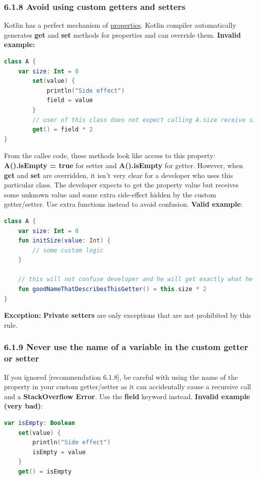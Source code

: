 \subsubsection*{\textbf{6.1.8 Avoid using custom getters and setters}}
\leavevmode\newline
\label{sec:6.1.8}
Kotlin has a perfect mechanism of \href{https://kotlinlang.org/docs/reference/properties.html#properties-and-fields}{properties}.
Kotlin compiler automatically generates \textbf{get} and \textbf{set} methods for properties and can override them.
\textbf{Invalid example:}
\begin{lstlisting}[language=Kotlin]
class A {
    var size: Int = 0
        set(value) {
            println("Side effect")
            field = value
        }
        // user of this class does not expect calling A.size receive size * 2 
        get() = field * 2
}
\end{lstlisting}
From the callee code, these methods look like access to this property: \textbf{A().isEmpty = true} for setter and \textbf{A().isEmpty} for getter.
However, when \textbf{get} and \textbf{set} are overridden, it  isn't very clear for a developer who uses this particular class. 
The developer expects to get the property value but receives some unknown value and some extra side-effect hidden by the custom getter/setter. 
Use extra functions instead to avoid confusion.
\textbf{Valid example}:
\begin{lstlisting}[language=Kotlin]
class A {
    var size: Int = 0
    fun initSize(value: Int) {
        // some custom logic
    }
    
    // this will not confuse developer and he will get exactly what he expects    
    fun goodNameThatDescribesThisGetter() = this.size * 2
}
\end{lstlisting}
\textbf{Exception:} \textbf{Private setters} are only exceptions that are not prohibited by this rule.
\subsubsection*{\textbf{6.1.9 Never use the name of a variable in the custom getter or setter}}
\leavevmode\newline
\label{sec:6.1.9}
If you ignored [recommendation 6.1.8], be careful with using the name of the property in your custom getter/setter
as it can accidentally cause a recursive call and a \textbf{StackOverflow Error}. Use the \textbf{field} keyword instead.
\textbf{Invalid example (very bad)}:
\begin{lstlisting}[language=Kotlin]
var isEmpty: Boolean
    set(value) {
        println("Side effect")
        isEmpty = value
    }
    get() = isEmpty
\end{lstlisting}
